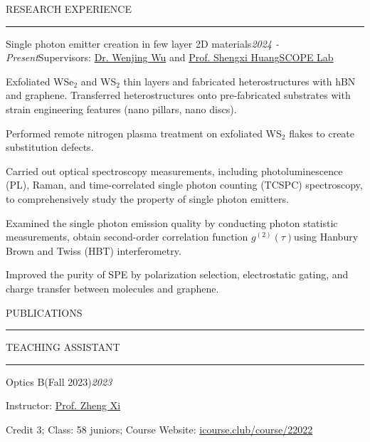 \documentclass{resume} %
\renewenvironment{rSection}[1]{
\sectionskip
\textcolor{CarnegieMellonRed}{\MakeUppercase{#1}}
\sectionlineskip
\hrule
\begin{list}{}{
\setlength{\leftmargin}{1.5em}
}
\item[]
}{
\end{list}
}
\begin{document}
\begin{rSection}{Research Experience}
\begin{rSubsection}{Single photon emitter creation in few layer 2D materials}{\textit{2024 - Present}}{Supervisors: \href{https://scholar.google.com/citations?user=lm68m7kAAAAJ&hl=en}{Dr. Wenjing Wu} and \href{https://profiles.rice.edu/faculty/shengxi-huang}{Prof. Shengxi Huang}}{\href{https://scopelab.rice.edu/}{SCOPE Lab}}
\item Exfoliated WSe$_2$ and WS$_2$ thin layers and fabricated heterostructures with hBN and graphene. Transferred heterostructures onto pre-fabricated substrates with strain engineering features (nano pillars, nano discs).
\item Performed remote nitrogen plasma treatment on exfoliated WS$_2$ flakes to create substitution defects.
\item Carried out optical spectroscopy measurements, including photoluminescence (PL), Raman, and time-correlated single photon counting (TCSPC) spectroscopy, to comprehensively study the property of single photon emitters.
\vspace{3pt}
\item Examined the single photon emission quality by conducting photon statistic measurements, obtain second-order correlation function $g^{(2)}(\tau) $using Hanbury Brown and Twiss (HBT) interferometry. 
\item Improved the purity of SPE by polarization selection, electrostatic gating, and charge transfer between molecules and graphene.
\end{rSubsection}

\end{rSection}


\begin{rSection}{Publications} \itemsep -2pt

\end{rSection}

\newpage

\begin{rSection}{Teaching assistant} \itemsep -2pt
\begin{rSubsection}{Optics B(Fall 2023)}{\em 2023}{}
\item \textbullet \hspace{0.3em} Instructor: \href{https://opt.ustc.edu.cn/2022/0327/c30405a550323/page.htm}{Prof. Zheng Xi}

\item \textbullet \hspace{0.3em} Credit 3; Class: 58 juniors; Course Website: \href{https://icourse.club/course/22022/#review-77240}{icourse.club/course/22022}
\end{rSubsection}
\end{rSection}
\end{document}
